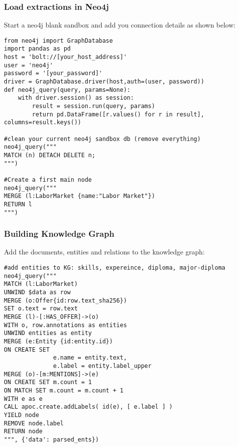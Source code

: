 \begin{frame}[fragile]\frametitle{Load extractions in Neo4j}

Start a neo4j blank sandbox and add you connection details as shown below:
 
\begin{lstlisting}
from neo4j import GraphDatabase
import pandas as pd
host = 'bolt://[your_host_address]'
user = 'neo4j'
password = '[your_password]'
driver = GraphDatabase.driver(host,auth=(user, password))
def neo4j_query(query, params=None):
    with driver.session() as session:
        result = session.run(query, params)
        return pd.DataFrame([r.values() for r in result], columns=result.keys())
      
#clean your current neo4j sandbox db (remove everything)
neo4j_query("""
MATCH (n) DETACH DELETE n;
""")

#Create a first main node
neo4j_query("""
MERGE (l:LaborMarket {name:"Labor Market"}) 
RETURN l
""")			
\end{lstlisting}
	 
\end{frame}

\begin{frame}[fragile]\frametitle{Building Knowledge Graph}

Add the documents, entities and relations to the knowledge graph:
 
\begin{lstlisting}
#add entities to KG: skills, expereince, diploma, major-diploma
neo4j_query("""
MATCH (l:LaborMarket)
UNWIND $data as row
MERGE (o:Offer{id:row.text_sha256})
SET o.text = row.text
MERGE (l)-[:HAS_OFFER]->(o)
WITH o, row.annotations as entities
UNWIND entities as entity
MERGE (e:Entity {id:entity.id})
ON CREATE SET 
              e.name = entity.text,
              e.label = entity.label_upper
MERGE (o)-[m:MENTIONS]->(e)
ON CREATE SET m.count = 1
ON MATCH SET m.count = m.count + 1
WITH e as e
CALL apoc.create.addLabels( id(e), [ e.label ] )
YIELD node
REMOVE node.label
RETURN node
""", {'data': parsed_ents})
\end{lstlisting}
	 
\end{frame}

